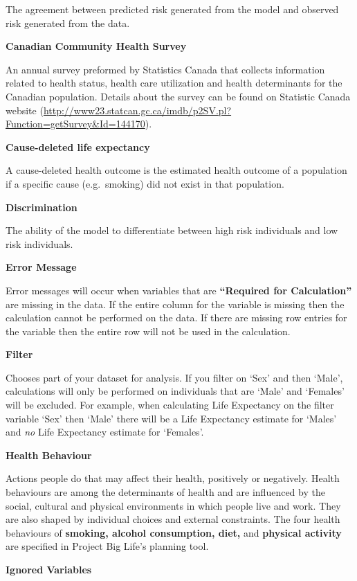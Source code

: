 \documentclass[]{book}
\begin{document}
The agreement between predicted risk generated from the model and
observed risk generated from the data.

\textbf{Canadian Community Health Survey}

An annual survey preformed by Statistics Canada that collects
information related to health status, health care utilization and health
determinants for the Canadian population. Details about the survey can
be found on Statistic Canada website
(\url{http://www23.statcan.gc.ca/imdb/p2SV.pl?Function=getSurvey\&Id=144170}).

\textbf{Cause-deleted life expectancy}

A cause-deleted health outcome is the estimated
health outcome of a population if a specific cause (e.g.~smoking) did
not exist in that population.

\textbf{Discrimination}

The ability of the model to differentiate between high risk individuals
and low risk individuals.

\textbf{Error Message}

Error messages will occur when variables that are
\textbf{``Required for Calculation''} are missing in the data. If the
entire column for the variable is missing then the calculation cannot be
performed on the data. If there are missing row entries for the variable
then the entire row will not be used in the calculation.

\textbf{Filter}

Chooses part of your dataset for analysis. If you filter on
`Sex' and then `Male', calculations will only be performed on
individuals that are `Male' and `Females' will be excluded. For example,
when calculating Life Expectancy on the filter variable `Sex' then
`Male' there will be a Life Expectancy estimate for `Males' and
\emph{no} Life Expectancy estimate for `Females'.

\textbf{Health Behaviour}

Actions people do that may affect their health, positively or
negatively. Health behaviours are among the determinants of health and
are influenced by the social, cultural and physical environments in
which people live and work.\citep{StatsCan2010} They are also shaped by
individual choices and external constraints.\citep{StatsCan2010} The
four health behaviours of \textbf{smoking, alcohol consumption, diet,}
and \textbf{physical activity} are specified in Project Big Life's
planning tool.

\textbf{Ignored Variables}
\end{document}
